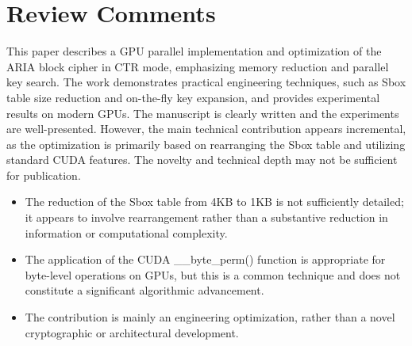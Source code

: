 \documentclass[a4paper]{article}
\begin{document}
\section{Review Comments}

This paper describes a GPU parallel implementation and optimization of the ARIA block cipher in CTR mode, emphasizing memory reduction and parallel key search. The work demonstrates practical engineering techniques, such as Sbox table size reduction and on-the-fly key expansion, and provides experimental results on modern GPUs. The manuscript is clearly written and the experiments are well-presented. However, the main technical contribution appears incremental, as the optimization is primarily based on rearranging the Sbox table and utilizing standard CUDA features. The novelty and technical depth may not be sufficient for publication.

\begin{itemize}
  \item The reduction of the Sbox table from 4KB to 1KB is not sufficiently detailed; it appears to involve rearrangement rather than a substantive reduction in information or computational complexity.
  \item The application of the CUDA \_\_byte\_perm() function is appropriate for byte-level operations on GPUs, but this is a common technique and does not constitute a significant algorithmic advancement.
  \item The contribution is mainly an engineering optimization, rather than a novel cryptographic or architectural development.
\end{itemize}

% 
\end{document}
